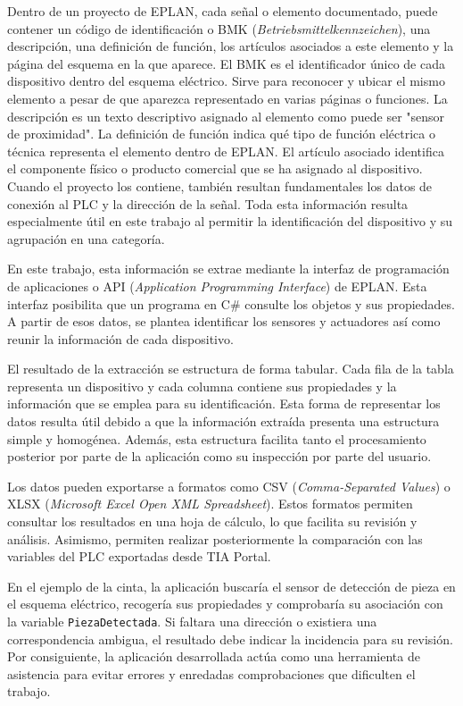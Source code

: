 Dentro de un proyecto de EPLAN, cada señal o elemento documentado, puede contener un código de identificación o BMK (\textit{Betriebsmittelkennzeichen}), una descripción, una definición de función, los artículos asociados a este elemento y la página del esquema en la que aparece. El BMK es el identificador único de cada dispositivo dentro del esquema eléctrico. Sirve para reconocer y ubicar el mismo elemento a pesar de que aparezca representado en varias páginas o funciones. La descripción es un texto descriptivo asignado al elemento como puede ser "sensor de proximidad". La definición de función indica qué tipo de función eléctrica o técnica representa el elemento dentro de EPLAN. El artículo asociado identifica el componente físico o producto comercial que se ha asignado al dispositivo. Cuando el proyecto los contiene, también resultan fundamentales los datos de conexión al PLC y la dirección de la señal. Toda esta información resulta especialmente útil en este trabajo al permitir la identificación del dispositivo y su agrupación en una categoría. 

En este trabajo, esta información se extrae mediante la interfaz de programación de aplicaciones o API (\textit{Application Programming Interface}) de EPLAN. Esta interfaz posibilita que un programa en C\# consulte los objetos y sus propiedades. A partir de esos datos, se plantea identificar los sensores y actuadores así como reunir la información de cada dispositivo.

El resultado de la extracción se estructura de forma tabular. Cada fila de la tabla representa un dispositivo y cada columna contiene sus propiedades y la información que se emplea para su identificación. Esta forma de representar los datos resulta útil debido a que la información extraída presenta una estructura simple y homogénea. Además, esta estructura facilita tanto el procesamiento posterior por parte de la aplicación como su inspección por parte del usuario.

Los datos pueden exportarse a formatos como CSV (\textit{Comma-Separated Values}) o XLSX (\textit{Microsoft Excel Open XML Spreadsheet}). Estos formatos permiten consultar los resultados en una hoja de cálculo, lo que facilita su revisión y análisis. Asimismo, permiten realizar posteriormente la comparación con las variables del PLC exportadas desde TIA Portal.


En el ejemplo de la cinta, la aplicación buscaría el sensor de detección de pieza en el esquema eléctrico, recogería sus propiedades y comprobaría su asociación con la variable \texttt{PiezaDetectada}. Si faltara una dirección o existiera una correspondencia ambigua, el resultado debe indicar la incidencia para su revisión. Por consiguiente, la aplicación desarrollada actúa como una herramienta de asistencia para evitar errores y enredadas comprobaciones que dificulten el trabajo. \\


